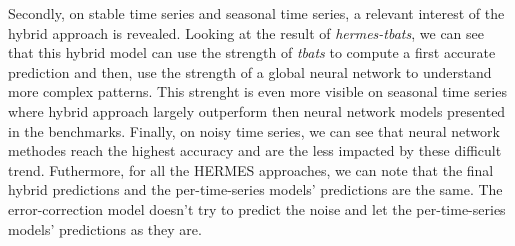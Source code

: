 \documentclass[10pt]{article} %
\begin{document}
{Secondly, on stable time series and seasonal time series, a relevant interest of the hybrid approach is revealed. Looking at the result of \textit{hermes-tbats}, we can see that this hybrid model can use the strength of \textit{tbats} to compute a first accurate prediction and then, use the strength of a global neural network to understand more complex patterns. This strenght is even more visible on seasonal time series where hybrid approach largely outperform then neural network models presented in the benchmarks.
Finally, on noisy time series, we can see that neural network methodes reach the highest accuracy and are the less impacted by these difficult trend. Futhermore, for all the HERMES approaches, we can note that the final hybrid predictions and the per-time-series models' predictions are the same. The error-correction model doesn't try to predict the noise and let the per-time-series models' predictions as they are.}
\end{document}

